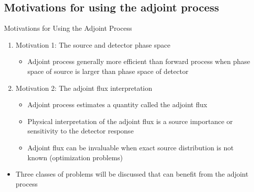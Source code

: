 \documentclass{beamer}
\begin{document}
\subsection{Motivations for using the adjoint process}
\begin{frame}{Motivations for Using the Adjoint Process}

  \begin{enumerate}
    \item Motivation 1: The source and detector phase space
      \smallskip
      \begin{itemize}
        \item Adjoint process generally more efficient than forward process 
          when phase space of source is larger than phase space of detector
      \end{itemize}
      \bigskip
      \bigskip
    \item Motivation 2: The adjoint flux interpretation
      \smallskip
      \begin{itemize}
        \item Adjoint process estimates a quantity called the adjoint flux
          \medskip
        \item Physical interpretation of the adjoint flux is a source 
          importance or sensitivity to the detector response
          \medskip
        \item Adjoint flux can be invaluable when exact source 
          distribution is not known (optimization problems)
      \end{itemize}
  \end{enumerate}

  \bigskip

  \begin{itemize}
    \item Three classes of problems will be discussed that can benefit from
      the adjoint process
  \end{itemize}

\end{frame}
\end{document}
